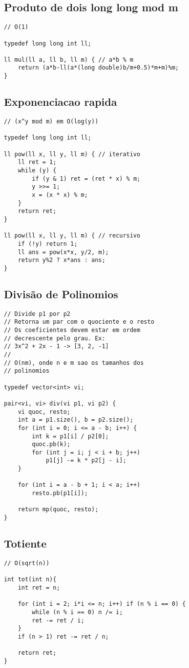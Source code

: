 \documentclass[12pt, a4paper, twoside]{article}
\begin{document}
\subsection{Produto de dois long long mod m}
\begin{lstlisting}
// O(1)

typedef long long int ll;

ll mul(ll a, ll b, ll m) { // a*b % m
	return (a*b-ll(a*(long double)b/m+0.5)*m+m)%m;	
}
\end{lstlisting}

\subsection{Exponenciacao rapida}
\begin{lstlisting}
// (x^y mod m) em O(log(y))

typedef long long int ll;

ll pow(ll x, ll y, ll m) { // iterativo
	ll ret = 1;
	while (y) {
		if (y & 1) ret = (ret * x) % m;
		y >>= 1;
		x = (x * x) % m;
	}
	return ret;
}

ll pow(ll x, ll y, ll m) { // recursivo
	if (!y) return 1;
	ll ans = pow(x*x, y/2, m);
	return y%2 ? x*ans : ans;
}
\end{lstlisting}

\subsection{Divisão de Polinomios}
\begin{lstlisting}
// Divide p1 por p2
// Retorna um par com o quociente e o resto
// Os coeficientes devem estar em ordem
// decrescente pelo grau. Ex:
// 3x^2 + 2x - 1 -> [3, 2, -1]
//
// O(nm), onde n e m sao os tamanhos dos
// polinomios

typedef vector<int> vi;

pair<vi, vi> div(vi p1, vi p2) {
	vi quoc, resto;
	int a = p1.size(), b = p2.size();
	for (int i = 0; i <= a - b; i++) {
		int k = p1[i] / p2[0];
		quoc.pb(k);
		for (int j = i; j < i + b; j++)
			p1[j] -= k * p2[j - i];
	}

	for (int i = a - b + 1; i < a; i++)
		resto.pb(p1[i]);

	return mp(quoc, resto);
}
\end{lstlisting}

\subsection{Totiente}
\begin{lstlisting}
// O(sqrt(n))

int tot(int n){
	int ret = n;

	for (int i = 2; i*i <= n; i++) if (n % i == 0) {
		while (n % i == 0) n /= i;
		ret -= ret / i;
	}
	if (n > 1) ret -= ret / n;

	return ret;
}
\end{lstlisting}
\end{document}
